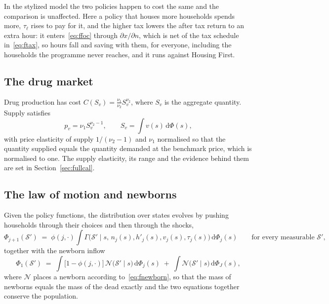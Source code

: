 \documentclass[10pt]{article}
\begin{document}
In the stylized model the two policies
happen to cost the same and the comparison
is unaffected. Here a policy that houses more households spends more,
$\tau_{\ell}$ rises to pay for it, and the higher tax lowers the after tax
return to an extra hour: it enters~\eqref{eq:ffoc} through
$\partial x/\partial n$, which is net of the tax schedule
in~\eqref{eq:ftax}, so hours fall and saving with them, for everyone,
including the households the programme never reaches,
and it runs against Housing First.

\subsection{The drug market}

Drug production has cost $C(S_v)=\frac{\nu_1}{\nu_2}S_v^{\nu_2}$, where
$S_v$ is the aggregate quantity. Supply satisfies
\begin{equation}\label{eq:fdrug}
p_v=\nu_1 S_v^{\nu_2-1},
\qquad S_v=\int v(s)\,\mathrm{d}\Phi(s),
\end{equation}
with price elasticity of supply $1/(\nu_2-1)$ and $\nu_1$ normalised so
that the quantity supplied equals the quantity demanded at the benchmark
price, which is normalised to one. The supply elasticity, its range
and the evidence behind them are set in Section~\ref{sec:fullcal}.

\subsection{The law of motion and newborns}\label{sec:fnewbornsec}

Given the policy functions, the distribution over states evolves by pushing
households through their choices and then through the shocks,
\begin{equation}\label{eq:flom}
\Phi_{j+1}(\mathcal S')\;=\;\phi(j,\cdot)\!\int
\Gamma\big(\mathcal S'\mid s,\,n_j(s),h'_j(s),v_j(s),\tau_j(s)\big)\,
\mathrm{d}\Phi_j(s)
\qquad\text{for every measurable } \mathcal S' ,
\end{equation}
together with the newborn inflow
\begin{equation}\label{eq:flomnew}
\Phi_{1}(\mathcal S')\;=\;\int\big[1-\phi(j,\cdot)\big]\,
\mathcal N\big(\mathcal S'\mid s\big)\,\mathrm{d}\Phi_j(s)
\;+\;\int \mathcal N\big(\mathcal S'\mid s\big)\,\mathrm{d}\Phi_J(s),
\end{equation}
where $\mathcal N$ places a newborn according to~\eqref{eq:fnewborn}, so that
the mass of newborns equals the mass of the dead exactly and the two equations
together conserve the population.
\end{document}
